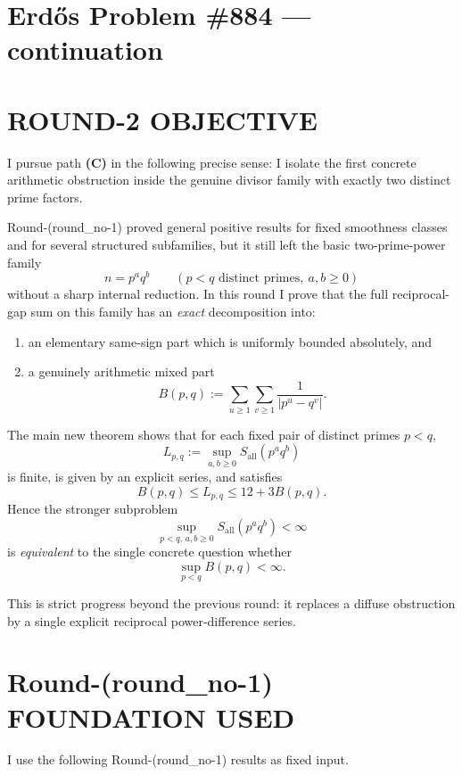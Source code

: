 \section{Erd\H{o}s Problem \#884 --- continuation}

\section{ROUND-2 OBJECTIVE}

I pursue path \textbf{(C)} in the following precise sense: I isolate the first concrete arithmetic obstruction inside the genuine divisor family with exactly two distinct prime factors.

Round-(round\_no-1) proved general positive results for fixed smoothness classes and for several structured subfamilies, but it still left the basic two-prime-power family
\[
n=p^a q^b \qquad (p<q\text{ distinct primes},\ a,b\ge 0)
\]
without a sharp internal reduction. In this round I prove that the full reciprocal-gap sum on this family has an \emph{exact} decomposition into:
\begin{enumerate}
\item an elementary same-sign part which is uniformly bounded absolutely, and
\item a genuinely arithmetic mixed part
\[
B(p,q):=\sum_{u\ge 1}\sum_{v\ge 1}\frac{1}{|p^u-q^v|}.
\]
\end{enumerate}

The main new theorem shows that for each fixed pair of distinct primes \(p<q\),
\[
L_{p,q}:=\sup_{a,b\ge 0} S_{\mathrm{all}}(p^a q^b)
\]
is finite, is given by an explicit series, and satisfies
\[
B(p,q)\le L_{p,q}\le 12+3B(p,q).
\]
Hence the stronger subproblem
\[
\sup_{p<q,\,a,b\ge 0} S_{\mathrm{all}}(p^a q^b)<\infty
\]
is \emph{equivalent} to the single concrete question whether
\[
\sup_{p<q} B(p,q)<\infty.
\]

This is strict progress beyond the previous round: it replaces a diffuse obstruction by a single explicit reciprocal power-difference series.

\section{Round-(round\_no-1) FOUNDATION USED}

I use the following Round-(round\_no-1) results as fixed input.

